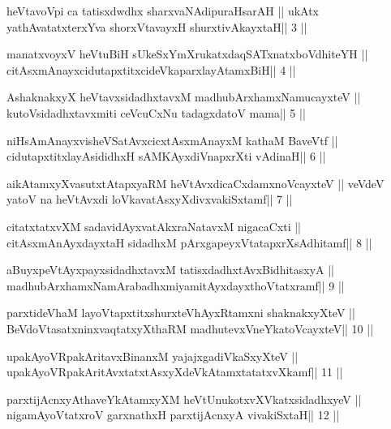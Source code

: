 \begin{shl}
heVtavoV\s pi ca tatisxdwdhx sharxvaNAdipuraHsarAH ||
ukAtx yathAvatatxterxYva shorxVtavayxH shurxtivAkayxtaH\hfill || 3 ||
\end{shl}

\begin{shl}
manatxvoyxV heVtuBiH sUkeSxYmXrukatxdaqSATxnatxboVdhiteYH ||
citAsxmAnayxcidutapxtitxcideVkaparxlayAtamxBiH\hfill || 4 ||
\end{shl}

\begin{shl}
AshaknakxyX heVtavxsidadhxtavxM madhubArxhamxNamucayxteV ||
kutoV\s sidadhxtavxmiti ceVcuCxNu tadagxdatoV mama\hfill || 5 ||
\end{shl}

\begin{shl}
niHsAmAnayxvisheVSatAvxcicxtAsxmAnayxM kathaM BaveVtf ||
cidutapxtitxlayAsididhxH sAMKAyxdiVnapxrXti vAdinaH\hfill || 6 ||
\end{shl}

\begin{shl}
aikAtamxyXvasutxtAtapxyaRM heVtAvxdicaCxdamxnoVcayxteV ||
veVdeV yatoV na heVtAvxdi loVkavatAsxyXdivxvakiSxtamf\hfill || 7 ||
\end{shl}

\begin{shl}
citatxtatxvXM sadavidAyxvatAkxraNatavxM nigacaCxti ||
citAsxmAnAyxdayxtaH sidadhxM pArxgapeyxVtatapxrXsAdhitamf\hfill || 8 ||
\end{shl}

\begin{shl}
aBuyxpeVtAyxpayxsidadhxtavxM tatisxdadhxtAvxBidhitasxyA ||
madhubArxhamxNamArabadhxmiyamitAyxdayxthoVtatxramf\hfill || 9 ||
\end{shl}

\begin{shl}
parxtideVhaM layoVtapxtitxshurxteVhAyxRtamxni shaknakxyXteV ||
BeVdoV\s tasatxninxvaqtatxyXthaRM madhutevxVneYkatoVcayxteV\hfill || 10 ||
\end{shl}

\begin{shl}
upakAyoVRpakAritavxBinanxM yajajxgadiVkaSxyXteV ||
upakAyoVRpakAritAvxtatxtAsxyXdeVkAtamxtatatxvXkamf\hfill || 11 ||
\end{shl}

\begin{shl}
parxtijAcnxyAthaveYkAtamxyXM heVtUnukotxvXVkatxsidadhxyeV ||
nigamAyoVtatxroV garxnathxH parxtijAcnxyA vivakiSxtaH\hfill || 12 ||
\end{shl}


